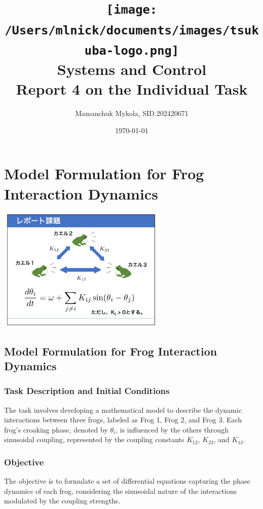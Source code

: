 \documentclass[12pt,a4paper]{article}
\title{
    \texttt{[image: /Users/mlnick/documents/images/tsukuba-logo.png]} \\
    \textbf{Systems and Control} \\
    \vspace{3mm}    
    Report 4 on the Individual Task
}
\author{Mamanchuk Mykola, SID.202420671}
\date{\today}
\begin{document}
\maketitle

\section{Model Formulation for Frog Interaction Dynamics}

\begin{center}
\includegraphics[width=0.6\textwidth]{materials/task1.jpeg}
\end{center}

\subsection{Model Formulation for Frog Interaction Dynamics}

\subsubsection{Task Description and Initial Conditions}
The task involves developing a mathematical model to describe the dynamic interactions between three frogs, labeled as Frog 1, Frog 2, and Frog 3. Each frog's croaking phase, denoted by $\theta_i$, is influenced by the others through sinusoidal coupling, represented by the coupling constants $K_{12}$, $K_{23}$, and $K_{13}$.

\subsubsection{Objective}
The objective is to formulate a set of differential equations capturing the phase dynamics of each frog, considering the sinusoidal nature of the interactions modulated by the coupling strengths.
\end{document}
